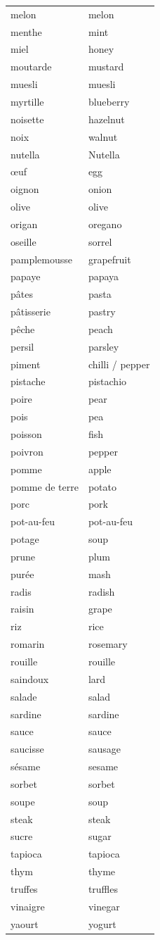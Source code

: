 \documentclass[12pt,a4paper]{article}
\begin{document}
\begin{longtable}{p{4cm} p{6cm}}
melon & melon \\
menthe & mint \\
miel & honey \\
moutarde & mustard \\
muesli & muesli \\
myrtille & blueberry \\
noisette & hazelnut \\
noix & walnut \\
nutella & Nutella \\
œuf & egg \\
oignon & onion \\
olive & olive \\
origan & oregano \\
oseille & sorrel \\
pamplemousse & grapefruit \\
papaye & papaya \\
pâtes & pasta \\
pâtisserie & pastry \\
pêche & peach \\
persil & parsley \\
piment & chilli / pepper \\
pistache & pistachio \\
poire & pear \\
pois & pea \\
poisson & fish \\
poivron & pepper \\
pomme & apple \\
pomme de terre & potato \\
porc & pork \\
pot-au-feu & pot-au-feu \\
potage & soup \\
prune & plum \\
purée & mash \\
radis & radish \\
raisin & grape \\
riz & rice \\
romarin & rosemary \\
rouille & rouille \\
saindoux & lard \\
salade & salad \\
sardine & sardine \\
sauce & sauce \\
saucisse & sausage \\
sésame & sesame \\
sorbet & sorbet \\
soupe & soup \\
steak & steak \\
sucre & sugar \\
tapioca & tapioca \\
thym & thyme \\
truffes & truffles \\
vinaigre & vinegar \\
yaourt & yogurt \\
\bottomrule
\end{longtable}
\end{document}

